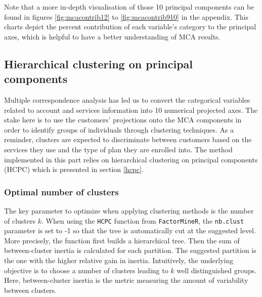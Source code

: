 \documentclass[
]{book}
\begin{document}
Note that a more in-depth visualisation of those 10 principal components can be found in figures \ref{fig:mcacontrib12} to \ref{fig:mcacontrib910} in the appendix. This charts depict the percent contribution of each variable's category to the principal axes, which is helpful to have a better understanding of MCA results.

\hypertarget{hierarchical-clustering-on-principal-components}{%
\subsection{Hierarchical clustering on principal components}\label{hierarchical-clustering-on-principal-components}}

Multiple correspondence analysis has led us to convert the categorical variables related to account and services information into 10 numerical projected axes. The stake here is to use the customers' projections onto the MCA components in order to identify groups of individuals through clustering techniques. As a reminder, clusters are expected to discriminate between customers based on the services they use and the type of plan they are enrolled into. The method implemented in this part relies on hierarchical clustering on principal components (HCPC) which is presented in section \ref{hcpc}.

\hypertarget{optimal-number-of-clusters}{%
\subsubsection*{Optimal number of clusters}\label{optimal-number-of-clusters}}

The key parameter to optimize when applying clustering methods is the number of clusters \(k\). When using the \texttt{HCPC} function from \texttt{FactorMineR}, the \texttt{nb.clust} parameter is set to -1 so that the tree is automatically cut at the suggested level. More precisely, the function first builds a hierarchical tree. Then the sum of between-cluster inertia is calculated for each partition. The suggested partition is the one with the higher relative gain in inertia. Intuitively, the underlying objective is to choose a number of clusters leading to \(k\) well distinguished groups. Here, between-cluster inertia is the metric measuring the amount of variability between clusters.
\end{document}
